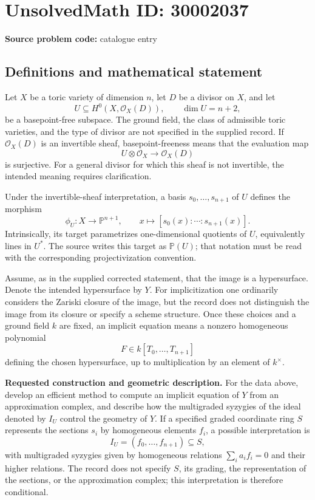 \documentclass[11pt]{article}
\begin{document}
\section*{UnsolvedMath ID: 30002037}
\textbf{Source problem code:} catalogue entry
\subsection{Definitions and mathematical statement}
Let \(X\) be a toric variety of dimension \(n\), let \(D\) be a divisor on \(X\), and let
\[
U\subseteq H^0(X,\mathcal O_X(D)),\qquad \dim U=n+2,
\]
be a basepoint-free subspace. The ground field, the class of admissible toric varieties, and the type of divisor are not specified in the supplied record. If \(\mathcal O_X(D)\) is an invertible sheaf, basepoint-freeness means that the evaluation map
\[
U\otimes\mathcal O_X\longrightarrow\mathcal O_X(D)
\]
is surjective. For a general divisor for which this sheaf is not invertible, the intended meaning requires clarification.

Under the invertible-sheaf interpretation, a basis \(s_0,\ldots,s_{n+1}\) of \(U\) defines the morphism
\[
\phi_U:X\longrightarrow\mathbb P^{n+1},\qquad
x\longmapsto[s_0(x):\cdots:s_{n+1}(x)].
\]
Intrinsically, its target parametrizes one-dimensional quotients of \(U\), equivalently lines in \(U^*\). The source writes this target as \(\mathbb P(U)\); that notation must be read with the corresponding projectivization convention.

Assume, as in the supplied corrected statement, that the image is a hypersurface. Denote the intended hypersurface by \(Y\). For implicitization one ordinarily considers the Zariski closure of the image, but the record does not distinguish the image from its closure or specify a scheme structure. Once these choices and a ground field \(k\) are fixed, an implicit equation means a nonzero homogeneous polynomial
\[
F\in k[T_0,\ldots,T_{n+1}]
\]
defining the chosen hypersurface, up to multiplication by an element of \(k^\times\).

\textbf{Requested construction and geometric description.} For the data above, develop an efficient method to compute an implicit equation of \(Y\) from an approximation complex, and describe how the multigraded syzygies of the ideal denoted by \(I_U\) control the geometry of \(Y\). If a specified graded coordinate ring \(S\) represents the sections \(s_i\) by homogeneous elements \(f_i\), a possible interpretation is
\[
I_U=(f_0,\ldots,f_{n+1})\subseteq S,
\]
with multigraded syzygies given by homogeneous relations \(\sum_i a_i f_i=0\) and their higher relations. The record does not specify \(S\), its grading, the representation of the sections, or the approximation complex; this interpretation is therefore conditional.
\end{document}
